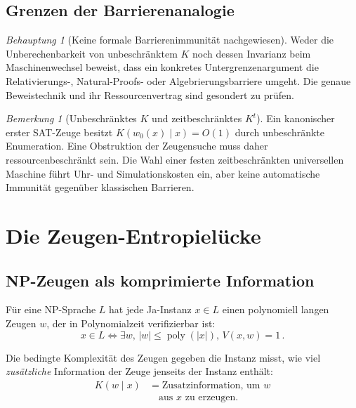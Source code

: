 \documentclass[aps,prd,twocolumn,superscriptaddress,nofootinbib]{revtex4-2}
\theoremstyle{definition}
\theoremstyle{remark}
\newtheorem{remark}[theorem]{Bemerkung}
\newtheorem{claim}[theorem]{Behauptung}
\DeclareMathOperator{\poly}{poly}
\begin{document}
\subsection{Grenzen der Barrierenanalogie}
\begin{claim}[Keine formale Barrierenimmunität nachgewiesen]
\label{claim:barrier_immune}
Weder die Unberechenbarkeit von unbeschränktem $K$
noch dessen Invarianz beim Maschinenwechsel beweist,
dass ein konkretes Untergrenzenargument die
Relativierungs-, Natural-Proofs- oder
Algebrierungsbarriere umgeht. Die genaue Beweistechnik
und ihr Ressourcenvertrag sind gesondert zu prüfen.
\end{claim}
\begin{remark}[Unbeschränktes $K$ und zeitbeschränktes $K^t$]
\label{rem:barrier-K-vs-Kt}
Ein kanonischer erster SAT-Zeuge besitzt
$K(w_0(x)\mid x)=O(1)$ durch unbeschränkte Enumeration.
Eine Obstruktion der Zeugensuche muss daher
ressourcenbeschränkt sein. Die Wahl einer festen
zeitbeschränkten universellen Maschine führt Uhr- und
Simulationskosten ein, aber keine automatische
Immunität gegenüber klassischen Barrieren.
\end{remark}

\section{Die Zeugen-Entropielücke}
\label{sec:gap}

\subsection{NP-Zeugen als komprimierte Information}

Für eine NP-Sprache $L$ hat jede Ja-Instanz $x \in L$ einen polynomiell langen Zeugen $w$, der in Polynomialzeit verifizierbar ist:
\begin{equation}
x \in L \iff \exists w,\, |w| \leq \poly(|x|),\, V(x, w) = 1\,.
\end{equation}

Die bedingte Komplexität des Zeugen gegeben die Instanz misst, wie viel \textit{zusätzliche} Information der Zeuge jenseits der Instanz enthält:
\begin{equation}
\begin{aligned}
K(w \mid x)
&= \text{Zusatzinformation, um } w\\
&\quad \text{aus } x \text{ zu erzeugen.}
\end{aligned}
\end{equation}
\end{document}
